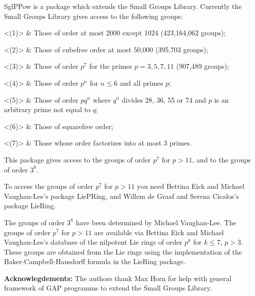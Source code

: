 

SglPPow is a package which extends the Small Groups Library. Currently the 
Small Groups Library gives access to the following groups:

\beginitems
<(1)> & Those of order at most 2000 except 1024 (423,164,062 groups);

<(2)> & Those of cubefree order at most 50,000 (395,703 groups);

<(3)> & Those of order $p^{7}$ for the primes $p=3,5,7,11$ (907,489 groups);

<(4)> & Those of order $p^{n}$ for $n\leq 6$ and all primes $p$;

<(5)> & Those of order $pq^{n}$ where $q^{n}$ divides 28, 36, 55 or 74 and 
     $p$ is an arbitrary prime not equal to $q$;

<(6)> & Those of squarefree order;

<(7)> & Those whose order factorizes into at most 3 primes.
\enditems

This package gives access to the groups of order $p^{7}$ for $p>11$, and to
the groups of order $3^{8}$.

To access the groups of order $p^{7}$ for $p>11$ you need Bettina Eick and
Michael Vaughan-Lee's package LiePRing, and Willem de Graaf and Serena 
Cicalos's package LieRing. 

The groups of order $3^{8}$ have been determined by Michael Vaughan-Lee.
The groups of order $p^{7}$ for $p>11$ are available via Bettina Eick and 
Michael Vaughan-Lee's database of the nilpotent Lie rings of order $p^{k}$ 
for $k\leq 7$, $p>3$. These groups are obtained from the Lie rings using 
the implementation of the Baker-Campbell-Hausdorff formula in the LieRing
package.

{\bf Acknowlegdements:} The authors thank Max Horn for help with general 
framework of GAP programms to extend the Small Groups Library.

